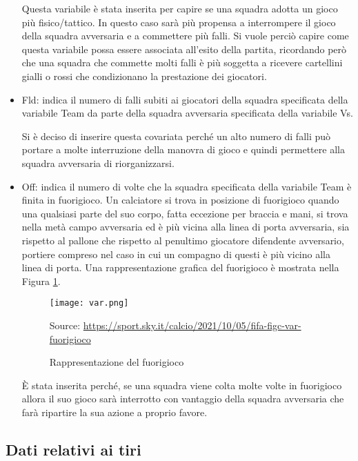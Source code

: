 \begin{itemize}
	Questa variabile è stata inserita per capire se una squadra adotta un gioco più fisico/tattico. In questo caso sarà più propensa a interrompere il gioco della squadra avversaria e a commettere più falli. Si vuole perciò capire come questa variabile possa essere associata all'esito della partita, ricordando però che una squadra che commette molti falli è più soggetta a ricevere cartellini gialli o rossi che condizionano la prestazione dei giocatori.
	\item \textsf{Fld}: indica il numero di falli subiti ai giocatori della squadra specificata della variabile \textsf{Team} da parte della squadra avversaria specificata della variabile \textsf{Vs}. 
	
	Si è deciso di inserire questa covariata perché un alto numero di falli può portare a molte interruzione della manovra di gioco e quindi permettere alla squadra avversaria di riorganizzarsi.
	
	\item \textsf{Off}: indica il numero di volte che la squadra specificata della variabile \textsf{Team} è finita in fuorigioco. Un calciatore si trova in posizione di fuorigioco quando una qualsiasi parte del suo corpo, fatta eccezione per braccia e mani, si trova nella metà campo avversaria ed è più vicina alla linea di porta avversaria, sia rispetto al pallone che rispetto al penultimo giocatore difendente avversario, portiere compreso nel caso in cui un compagno di questi è più vicino alla linea di porta. Una rappresentazione grafica del fuorigioco è mostrata nella Figura \ref{fig:offside}.
	
	\begin{figure}[!ht]
		\begin{center}
			\texttt{[image: var.png]}
			
			\caption{Rappresentazione del fuorigioco} \label{fig:offside}
			Source: \url{https://sport.sky.it/calcio/2021/10/05/fifa-figc-var-fuorigioco}
		\end{center}
	\end{figure}
	
	È stata inserita perché, se una squadra viene colta molte volte in fuorigioco allora il suo gioco sarà interrotto con vantaggio della squadra avversaria che farà ripartire la sua azione a proprio favore.
	
\end{itemize}

\subsection{Dati relativi ai tiri}

